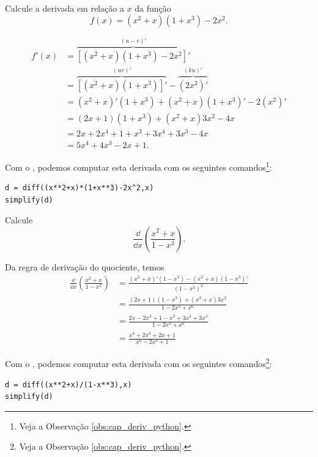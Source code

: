 \begin{exeresol}
  Calcule a derivada em relação a $x$ da função
  \begin{equation}
    f(x) = (x^2+x)(1 + x^3) - 2x^2.
  \end{equation}
\end{exeresol}
\begin{resol}
  \begin{align}
    f'(x) &= \overbrace{\left[(x^2+x)(1 + x^3) - 2x^2\right]'}^{(u-v)'} \\
          &= \overbrace{\left[(x^2+x)(1 + x^3)\right]'}^{(uv)'} - \overbrace{(2x^2)'}^{(ku)'} \\
          &= (x^2+x)'(1+x^3) + (x^2+x)(1+x^3)' - 2(x^2)'\\
          &= (2x+1)(1+x^3) + (x^2+x)3x^2 - 4x\\
          &= 2x+2x^4+1+x^3+3x^4+3x^3-4x\\
          &= 5x^4+4x^3-2x+1.
  \end{align}
  
  \ifispython
  Com o \sympy, podemos computar esta derivada com os seguintes comandos\footnote{Veja a Observação \ref{obs:cap_deriv_python}.}:
\begin{verbatim}
d = diff((x**2+x)*(1+x**3)-2x^2,x)
simplify(d)
\end{verbatim}
  \fi
\end{resol}

\begin{exeresol}
  Calcule
  \begin{equation}
    \frac{\dd}{\dd x}\left(\frac{x^2+x}{1-x^3}\right).
  \end{equation}
\end{exeresol}
\begin{resol}
  Da regra de derivação do quociente, temos
  \begin{align}
    \frac{\dd}{\dd x}\left(\frac{x^2+x}{1-x^3}\right) &= \frac{(x^2+x)'(1-x^3)-(x^2+x)(1-x^3)'}{(1-x^3)^2}\\
                                                      &= \frac{(2x+1)(1-x^3)+(x^2+x)3x^2}{1-2x^3+x^6} \\
                                                      &= \frac{2x-2x^4+1-x^3+3x^4+3x^3}{1-2x^3+x^6} \\
                                                      &= \frac{x^4+2x^3+2x+1}{x^6-2x^3+1}
  \end{align}
  
  \ifispython
  Com o \sympy, podemos computar esta derivada com os seguintes comandos\footnote{Veja a Observação \ref{obs:cap_deriv_python}.}:
\begin{verbatim}
d = diff((x**2+x)/(1-x**3),x)
simplify(d)
\end{verbatim}
  \fi
\end{resol}

